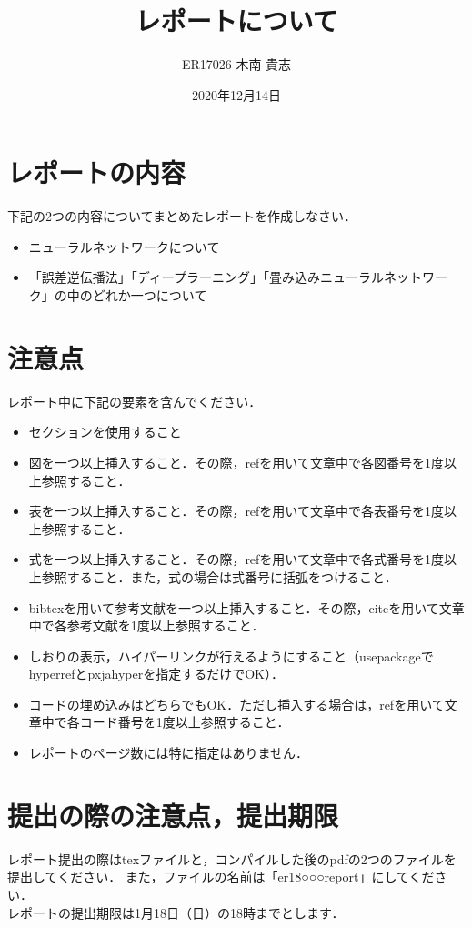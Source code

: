 \documentclass[a4paper,10pt]{jsarticle}
\title{レポートについて}%
\author{ER17026 木南 貴志}%
\date{2020年12月14日}%
\begin{document}
\maketitle
\section{レポートの内容}
下記の2つの内容についてまとめたレポートを作成しなさい．
\begin{itemize}
    \item ニューラルネットワークについて\\
    \item 「誤差逆伝播法」「ディープラーニング」「畳み込みニューラルネットワーク」の中のどれか一つについて
\end{itemize}

\section{注意点}
レポート中に下記の要素を含んでください．
\begin{itemize}
    \item セクションを使用すること
    \item 図を一つ以上挿入すること．その際，refを用いて文章中で各図番号を1度以上参照すること． 
    \item 表を一つ以上挿入すること．その際，refを用いて文章中で各表番号を1度以上参照すること．
    \item 式を一つ以上挿入すること．その際，refを用いて文章中で各式番号を1度以上参照すること．また，式の場合は式番号に括弧をつけること． 
    \item bibtexを用いて参考文献を一つ以上挿入すること．その際，citeを用いて文章中で各参考文献を1度以上参照すること．
    \item しおりの表示，ハイパーリンクが行えるようにすること（usepackageでhyperrefとpxjahyperを指定するだけでOK）．
    \item コードの埋め込みはどちらでもOK．ただし挿入する場合は，refを用いて文章中で各コード番号を1度以上参照すること． 
    \item レポートのページ数には特に指定はありません．
\end{itemize}

\section{提出の際の注意点，提出期限}
レポート提出の際はtexファイルと，コンパイルした後のpdfの2つのファイルを提出してください．
また，ファイルの名前は「er18○○○report」にしてください．\\
レポートの提出期限は1月18日（日）の18時までとします．
\end{document}
